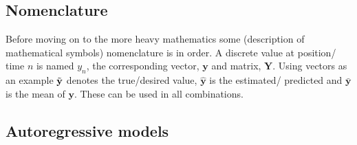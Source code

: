 \subsection{Nomenclature} \label{sec:nomenclature}
Before moving on to the more heavy mathematics some (description of mathematical symbols) nomenclature is in order. A discrete value at position/ time $n$ is named $y_n$, the corresponding vector, $\mathbf{y}$ and matrix, $\mathbf{Y}$. Using vectors as an example $\Tilde{\mathbf{y}}$ denotes the true/desired value, $\hat{\mathbf{y}}$ is the estimated/ predicted and $\bar{\mathbf{y}}$ is the mean of $\mathbf{y}$. These can be used in all combinations.

\subsection{Autoregressive models} \label{sec:ARmodels}

